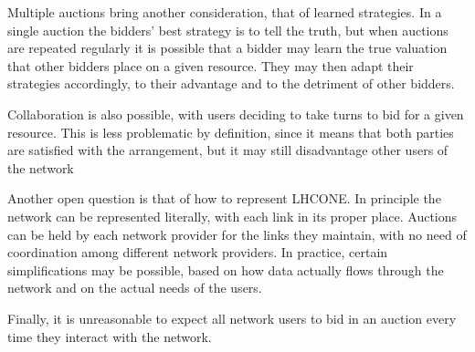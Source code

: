 Multiple auctions bring another consideration, that of learned strategies. In a single auction the bidders' best strategy is to tell the truth, but when auctions are repeated regularly it is possible that a bidder may learn the true valuation that other bidders place on a given resource. They may then adapt their strategies accordingly, to their advantage and to the detriment of other bidders. 

Collaboration is also possible, with users deciding to take turns to bid for a given resource. This is less problematic by definition, since it means that both parties are satisfied with the arrangement, but it may still disadvantage other users of the network

Another open question is that of how to represent LHCONE. In principle the network can be represented literally, with each link in its proper place. Auctions can be held by each network provider for the links they maintain, with no need of coordination among different network providers. In practice, certain simplifications may be possible, based on how data actually flows through the network and on the actual needs of the users.

Finally, it is unreasonable to expect all network users to bid in an auction every time they interact with the network. 
